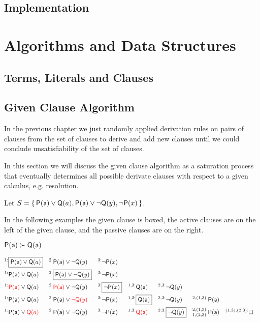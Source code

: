 
\section{Implementation}

\chapter{Algorithms and Data Structures}

\section{Terms, Literals and Clauses}




\section{Given Clause Algorithm}

In the previous chapter we just randomly applied derivation rules
on pairs of clauses from the set of clauses 
to derive and add new clauses 
until we could conclude unsatisfiability of the set of clauses.

In this section we will discuss the given clause algorithm 
as a saturation process that eventually determines all possible derivate clauses
with respect to a given calculus, e.g. resolution.


Let $S=\{\, {\mathsf P}({\mathsf a})\lor{\mathsf Q}(a), {\mathsf P}({\mathsf a})\lor\lnot{\mathsf Q}(y), \lnot{\mathsf P}(x) \,\}$.

In the following examples the given clause is boxed, 
the active clauses are on the left of the given clause, 
and the passive clauses are on the right.

\begin{example} ${\mathsf P}({\mathsf a})\succ{\mathsf Q}({\mathsf a})$
	
	\begin{align*}
	^{1:}&\boxed{\mP(\ma)\lor\mQ(a)} & ^{2:}&\mP(\ma)\lor\lnot\mQ(y) & ^{3:}&\lnot\mP(x) 
	\\
	^{1:}&\mP(\ma)\lor\mQ(a) & ^{2:}&\boxed{\mP(\ma)\lor\lnot\mQ(y)} & ^{3:}&\lnot\mP(x) 
	\\
	^{1:}&{\colLo\mP(\ma)}\lor\mQ(a) & ^{2:}&{\colLo\mP(\ma)}\lor\lnot\mQ(y) & ^{3:}&\boxed{\lnot\mP(x)} 
	& ^{1,3:}&\mQ(\ma) & ^{2,3:}&\lnot\mQ(y)
	\\
	^{1:}&\mP(\ma)\lor\mQ(a) & ^{2:}&\mP(\ma)\lor{\colLo\lnot\mQ(y)} & ^{3:}&\lnot\mP(x)
	& ^{1,3:}&\boxed{\mQ(\ma)} & ^{2,3:}&\lnot\mQ(y) & ^{2,(1,3):}&\mP(\ma)
	\\
	^{1:}&\mP(\ma)\lor{\colLo\mQ(a)} & ^{2:}&\mP(\ma)\lor\lnot\mQ(y) & ^{3:}&\lnot\mP(x)
	& ^{1,3:}&\colLo\mQ(\ma) & ^{2,3:}&\boxed{\lnot\mQ(y)} & ^{2,(1,3):}_{1,(2,3):}&\mP(\ma)
	& ^{(1,3),(2,3):}&\emptyclause
	\\
	\end{align*}
\end{example}

